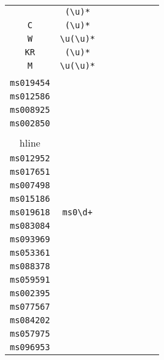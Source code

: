 \begin{longtable}{cccccccc}
\begin{tabular}{ll}
    \verb|| & \verb|(\u)*|\\
\verb|C| & \verb|(\u)*|\\
\verb|W| & \verb|\u(\u)*|\\
\verb|KR| & \verb|(\u)*|\\
\verb|M| & \verb|\u(\u)*|
\end{tabular}
\\\midrule 
\begin{tabular}{l}
    \verb|ms025846|\\
\verb|ms019454|\\
\verb|ms012586|\\
\verb|ms008925|\\
\verb|ms002850|\\
\\hline\\
\verb|ms012952|\\
\verb|ms017651|\\
\verb|ms007498|\\
\verb|ms015186|\\
\verb|ms019618|
\end{tabular}

&
\verb|ms0\d+|
&

\begin{tabular}{l}
    \verb|ms0\d\d\d\d\d|\\
\verb|ms083084|\\
\verb|ms093969|\\
\verb|ms053361|\\
\verb|ms088378|\\
\verb|ms059591|
\end{tabular}

&

\begin{tabular}{l}
    \verb|ms0\d\d\d\d\d|\\
\verb|ms002395|\\
\verb|ms077567|\\
\verb|ms084202|\\
\verb|ms057975|\\
\verb|ms096953|
\end{tabular}

&


\end{longtable}
